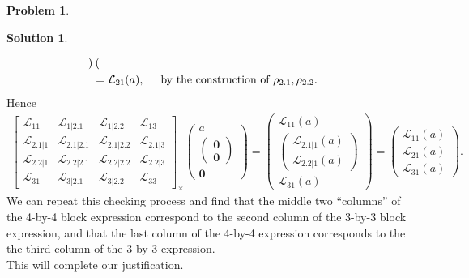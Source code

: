\documentclass{article}
\theoremstyle{definition}
\newtheorem*{prob*}{Problem}
\newtheorem*{sln*}{Solution}
\newcommand{\lag}{\mathcal{L}}
\begin{document}
\begin{prob*}
\begin{sln*}
\begin{enumerate}
\begin{align*}
\begin{pmatrix}
		\end{pmatrix}\\
		&= \lag_{21}(a), \hspace{0.5cm}\text{by the construction of }\rho_{2.1}, \rho_{2.2}.
		\end{align*}
		Hence
		\begin{align*}
		\begin{bmatrix}
		\lag_{11} & \lag_{1|2.1} & \lag_{1|2.2} & \lag_{13}\\
		\lag_{2.1|1} & \lag_{2.1|2.1} & \lag_{2.1|2.2} & \lag_{2.1|3}\\
		\lag_{2.2|1} & \lag_{2.2|2.1} & \lag_{2.2|2.2} & \lag_{2.2|3}\\
		\lag_{31} & \lag_{3|2.1} & \lag_{3|2.2} & \lag_{33}
		\end{bmatrix}_\times \begin{pmatrix}
		a \\ \begin{pmatrix}
		\mathbf{0}\\\mathbf{0}
		\end{pmatrix}\\
		\mathbf{0}
		\end{pmatrix} = \begin{pmatrix}
		\lag_{11}(a)\\
		\begin{pmatrix}
		\lag_{2.1|1}(a)\\
		\lag_{2.2|1}(a)
		\end{pmatrix}\\
		\lag_{31}(a)
		\end{pmatrix} = \begin{pmatrix}
		\lag_{11}(a)\\
		\lag_{21}(a)\\
		\lag_{31}(a)
		\end{pmatrix}.
		\end{align*}
		We can repeat this checking process and find that the middle two ``columns'' of the 4-by-4 block expression correspond to the second column of the 3-by-3 block expression, and that the last column of the 4-by-4 expression corresponds to the the third column of the 3-by-3 expression.\\

		This will complete our justification.\\ 
		
		
		
		
		

\end{enumerate}
\end{sln*}
\end{prob*}
\end{document}
